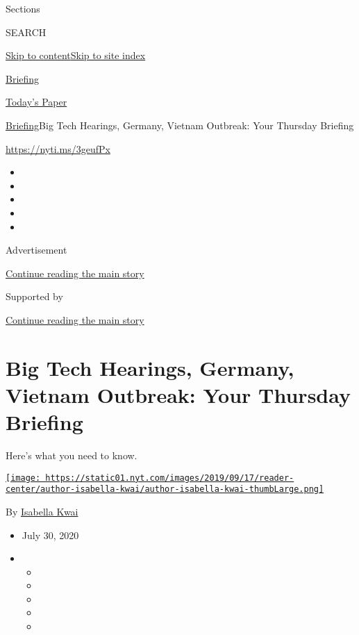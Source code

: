 Sections

SEARCH

\protect\hyperlink{site-content}{Skip to
content}\protect\hyperlink{site-index}{Skip to site index}

\href{https://www.nytimes.com/interactive/2018/briefing/global-morning-briefing-newsletter-signup.html}{Briefing}

\href{https://myaccount.nytimes.com/auth/login?response_type=cookie\&client_id=vi}{}

\href{https://www.nytimes.com/section/todayspaper}{Today's Paper}

\href{/interactive/2018/briefing/global-morning-briefing-newsletter-signup.html}{Briefing}\textbar{}Big
Tech Hearings, Germany, Vietnam Outbreak: Your Thursday Briefing

\url{https://nyti.ms/3geufPx}

\begin{itemize}
\item
\item
\item
\item
\item
\end{itemize}

Advertisement

\protect\hyperlink{after-top}{Continue reading the main story}

Supported by

\protect\hyperlink{after-sponsor}{Continue reading the main story}

\hypertarget{big-tech-hearings-germany-vietnam-outbreak-your-thursday-briefing}{%
\section{Big Tech Hearings, Germany, Vietnam Outbreak: Your Thursday
Briefing}\label{big-tech-hearings-germany-vietnam-outbreak-your-thursday-briefing}}

Here's what you need to know.

\href{https://www.nytimes.com/by/isabella-kwai}{\texttt{[image: https://static01.nyt.com/images/2019/09/17/reader-center/author-isabella-kwai/author-isabella-kwai-thumbLarge.png]}}

By \href{https://www.nytimes.com/by/isabella-kwai}{Isabella Kwai}

\begin{itemize}
\item
  July 30, 2020
\item
  \begin{itemize}
  \item
  \item
  \item
  \item
  \item
  \end{itemize}
\end{itemize}

